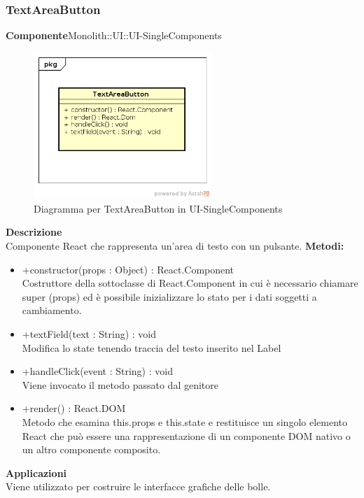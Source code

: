 \subsubsection{TextAreaButton}
\textbf{Componente}Monolith::UI::UI-SingleComponents\\
   \FloatBarrier
   \begin{figure}[ht]
   \centering
   \includegraphics[width=0.6\textwidth]{img/single-TextAreaButton}
   \caption{{Diagramma per TextAreaButton in UI-SingleComponents}}
\end{figure}
\FloatBarrier
\textbf{Descrizione}\\
Componente React che rappresenta un'area di testo con un pulsante.
\textbf{Metodi:} \begin{itemize}\item +constructor(props : Object) : React.Component \\Costruttore della sottoclasse di React.Component in cui è necessario chiamare super (props) ed è possibile inizializzare lo stato per i dati soggetti a cambiamento.\item +textField(text : String) : void \\Modifica lo state tenendo traccia del testo inserito nel Label\item +handleClick(event : String) : void  \\Viene invocato il metodo passato dal genitore\item +render() : React.DOM \\Metodo che esamina this.props e this.state e restituisce un singolo elemento React che può essere una rappresentazione di un componente DOM nativo o un altro componente composito.\end{itemize} 


\textbf{Applicazioni}\\
Viene utilizzato per costruire le interfacce grafiche delle bolle. 


